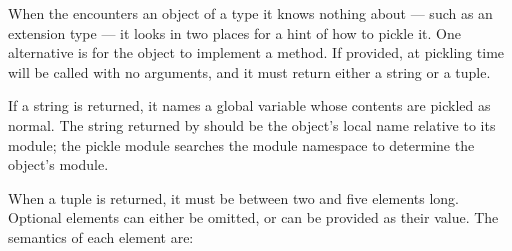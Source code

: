 When the  encounters an object of a type it knows
nothing about --- such as an extension type --- it looks in two places
for a hint of how to pickle it.  One alternative is for the object to
implement a  method.  If provided, at pickling
time  will be called with no arguments, and it
must return either a string or a tuple.

If a string is returned, it names a global variable whose contents are
pickled as normal.  The string returned by  should
be the object's local name relative to its module; the pickle module
searches the module namespace to determine the object's module.

When a tuple is returned, it must be between two and five elements
long. Optional elements can either be omitted, or  can be provided 
as their value.  The semantics of each element are:

